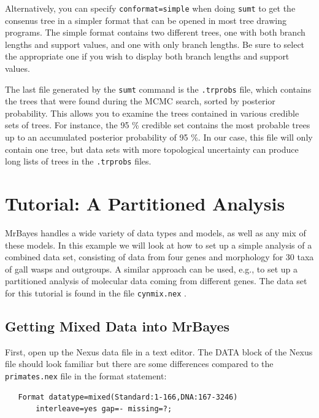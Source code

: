 \documentclass[12pt]{book}
\newcommand{\ttt}[1]{\texttt{#1} }
\begin{document}
Alternatively, you can specify \ttt{conformat=simple} when doing \ttt{sumt} to get the
consenus tree in a simpler format that can be opened in most tree drawing programs. The simple
format contains two different trees, one with both branch lengths and support values, and one with
only branch lengths.  Be sure to select the appropriate one if you wish to display both branch
lengths and support values.

The last file generated by the \ttt{sumt} command is the \ttt{.trprobs} file, which contains
the trees that were found during the MCMC search, sorted by posterior probability. This allows you
to examine the trees contained in various credible sets of trees. For instance, the 95 \% credible
set contains the most probable trees up to an accumulated posterior probability of 95 \%. In our
case, this file will only contain one tree, but data sets with more topological uncertainty can
produce long lists of trees in the \ttt{.trprobs} files.

\chapter{Tutorial: A Partitioned Analysis}
\label{tutorialPartitioned}
MrBayes handles a wide variety of data types and models, as well as any mix of these models. In
this example we will look at how to set up a simple analysis of a combined data set, consisting of
data from four genes and morphology for 30 taxa of gall wasps and outgroups. A similar approach can
be used, e.g., to set up a partitioned analysis of molecular data coming from different genes. The
data set for this tutorial is found in the file \ttt{cynmix.nex}.

\section{Getting Mixed Data into MrBayes}

First, open up the Nexus data file in a text editor. The DATA block of the Nexus file should look
familiar but there are some differences compared to the \ttt{primates.nex} file in the format
statement:

\begin{singlespacing}
\small
\begin{verbatim}
   Format datatype=mixed(Standard:1-166,DNA:167-3246)
       interleave=yes gap=- missing=?;
\end{verbatim}
\normalsize
\end{singlespacing}
\end{document}
